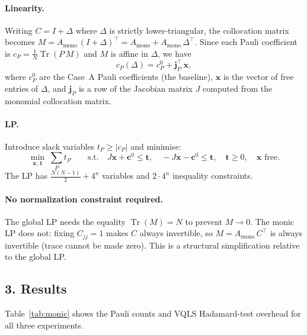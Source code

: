\documentclass{article}
\begin{document}
\paragraph{Linearity.}
Writing $C = I + \Delta$ where $\Delta$ is strictly lower-triangular, the collocation
matrix becomes $M = A_{\mathrm{mono}}\,(I+\Delta)^{\top} = A_{\mathrm{mono}} + A_{\mathrm{mono}}\,\Delta^{\top}$.
Since each Pauli coefficient is $c_P = \tfrac{1}{N}\operatorname{Tr}(P\,M)$ and $M$
is affine in $\Delta$, we have
\begin{equation}
    c_P(\Delta) = c_P^0 + \mathbf{j}_P^{\top}\,\mathbf{x},
\end{equation}
where $c_P^0$ are the Case~A Pauli coefficients (the baseline), $\mathbf{x}$ is the
vector of free entries of $\Delta$, and $\mathbf{j}_P$ is a row of the Jacobian matrix
$J$ computed from the monomial collocation matrix.

\paragraph{LP.}
Introduce slack variables $t_P \geq |c_P|$ and minimise:
\begin{equation}
    \min_{\mathbf{x},\,\mathbf{t}}\;\sum_{P} t_P
    \qquad\text{s.t.}\quad
    J\mathbf{x} + \mathbf{c}^0 \leq \mathbf{t},
    \quad
    -J\mathbf{x} - \mathbf{c}^0 \leq \mathbf{t},
    \quad
    \mathbf{t} \geq 0,
    \quad
    \mathbf{x} \text{ free}.
    \label{eq:monic-lp}
\end{equation}
The LP has $\tfrac{N(N-1)}{2} + 4^n$ variables and $2\cdot 4^n$ inequality constraints.

\paragraph{No normalization constraint required.}
The global LP needs the equality $\operatorname{Tr}(M) = N$ to prevent $M \to 0$.
The monic LP does not: fixing $C_{jj}=1$ makes $C$ always invertible, so $M =
A_{\mathrm{mono}}\,C^{\top}$ is always invertible (trace cannot be made zero).
This is a structural simplification relative to the global LP.

\subsection*{3. Results}

Table~\ref{tab:monic} shows the Pauli counts and VQLS Hadamard-test overhead for
all three experiments.
\end{document}
